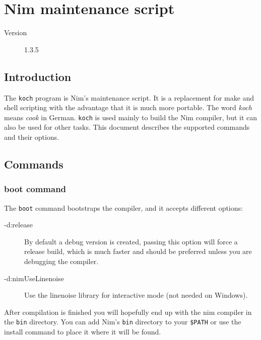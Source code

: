 \hypertarget{nim-maintenance-script}{%
\section{Nim maintenance script}\label{nim-maintenance-script}}

\begin{description}
\item[Version]
1.3.5
\end{description}

\hypertarget{introduction}{%
\subsection{Introduction}\label{introduction}}

The \texttt{koch} program is Nim's maintenance script. It is a
replacement for make and shell scripting with the advantage that it is
much more portable. The word \emph{koch} means \emph{cook} in German.
\texttt{koch} is used mainly to build the Nim compiler, but it can also
be used for other tasks. This document describes the supported commands
and their options.

\hypertarget{commands}{%
\subsection{Commands}\label{commands}}

\hypertarget{boot-command}{%
\subsubsection{boot command}\label{boot-command}}

The \texttt{boot} command bootstraps the compiler, and it accepts
different options:

\begin{description}
\item[-d:release]
By default a debug version is created, passing this option will force a
release build, which is much faster and should be preferred unless you
are debugging the compiler.
\item[-d:nimUseLinenoise]
Use the linenoise library for interactive mode (not needed on Windows).
\end{description}

After compilation is finished you will hopefully end up with the nim
compiler in the \texttt{bin} directory. You can add Nim's \texttt{bin}
directory to your \texttt{\$PATH} or use the install command to place it
where it will be found.


